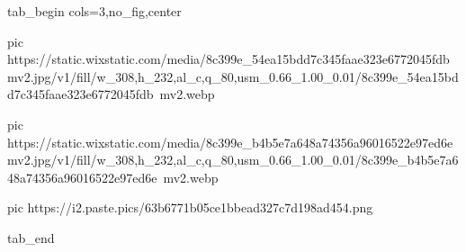  
 
 
 
 


\ifcmt
  tab_begin cols=3,no_fig,center

     pic https://static.wixstatic.com/media/8c399e_54ea15bdd7c345faae323e6772045fdb~mv2.jpg/v1/fill/w_308,h_232,al_c,q_80,usm_0.66_1.00_0.01/8c399e_54ea15bdd7c345faae323e6772045fdb~mv2.webp

		 pic https://static.wixstatic.com/media/8c399e_b4b5e7a648a74356a96016522e97ed6e~mv2.jpg/v1/fill/w_308,h_232,al_c,q_80,usm_0.66_1.00_0.01/8c399e_b4b5e7a648a74356a96016522e97ed6e~mv2.webp

		 pic https://i2.paste.pics/63b6771b05ce1bbead327c7d198ad454.png

  tab_end
\fi

